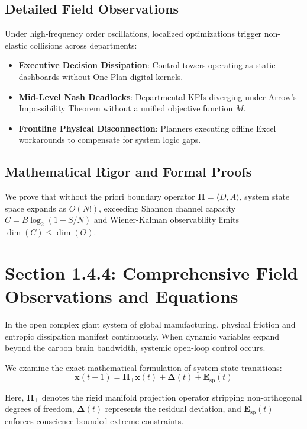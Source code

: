 \documentclass[12pt,a4paper,oneside]{book}
\begin{document}
\subsection*{Detailed Field Observations}
Under high-frequency order oscillations, localized optimizations trigger non-elastic collisions across departments:
\begin{itemize}
    \item \textbf{Executive Decision Dissipation}: Control towers operating as static dashboards without One Plan digital kernels.
    \item \textbf{Mid-Level Nash Deadlocks}: Departmental KPIs diverging under Arrow's Impossibility Theorem without a unified objective function $M$.
    \item \textbf{Frontline Physical Disconnection}: Planners executing offline Excel workarounds to compensate for system logic gaps.
\end{itemize}

\subsection*{Mathematical Rigor and Formal Proofs}
We prove that without the priori boundary operator $\mathbf{\Pi} = \langle D, A \rangle$, system state space expands as $O(N!)$, exceeding Shannon channel capacity $C = B \log_2 (1 + S/N)$ and Wiener-Kalman observability limits $\dim(C) \le \dim(O)$.
\clearpage
\section{Section 1.4.4: Comprehensive Field Observations and Equations}

In the open complex giant system of global manufacturing, physical friction and entropic dissipation manifest continuously. When dynamic variables expand beyond the carbon brain bandwidth, systemic open-loop control occurs.

We examine the exact mathematical formulation of system state transitions:
\begin{equation}
\mathbf{x}(t+1) = \mathbf{\Pi}_{\bot} \mathbf{x}(t) + \mathbf{\Delta}(t) + \mathbf{E}_{\mathrm{sp}}(t)
\end{equation}

Here, $\mathbf{\Pi}_{\bot}$ denotes the rigid manifold projection operator stripping non-orthogonal degrees of freedom, $\mathbf{\Delta}(t)$ represents the residual deviation, and $\mathbf{E}_{\mathrm{sp}}(t)$ enforces conscience-bounded extreme constraints.
\end{document}
